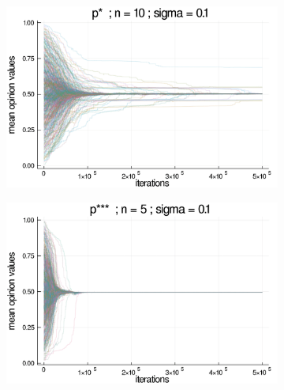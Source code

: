 \documentclass{article}
\begin{document}
\begin{figure}[H]
\begin{subfigure}[b]{0.48\textwidth}
        \includegraphics[width=\textwidth]{img/series/tseries4/Poodlcalculatepsn10-rho10e-5-sigma01-00intransrandom.png}
      \end{subfigure}
      \begin{subfigure}[b]{0.48\textwidth}
        \includegraphics[width=\textwidth]{img/series/tseries4/Poodlcalculatepsssn5-rho10e-5-sigma01-00intransrandom.png}
      \end{subfigure}

\end{figure}
\end{document}
